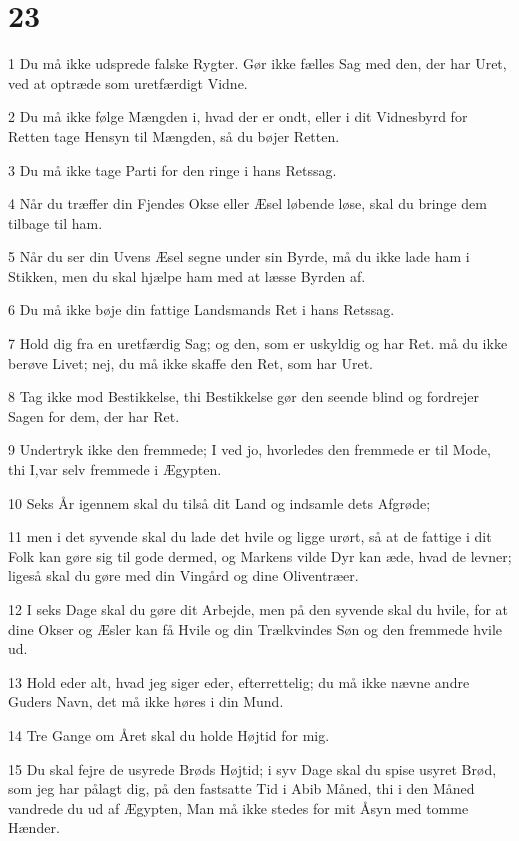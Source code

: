 \chapter{23}

\par 1 Du må ikke udsprede falske Rygter. Gør ikke fælles Sag med den, der har Uret, ved at optræde som uretfærdigt Vidne.
\par 2 Du må ikke følge Mængden i, hvad der er ondt, eller i dit Vidnesbyrd for Retten tage Hensyn til Mængden, så du bøjer Retten.
\par 3 Du må ikke tage Parti for den ringe i hans Retssag.
\par 4 Når du træffer din Fjendes Okse eller Æsel løbende løse, skal du bringe dem tilbage til ham.
\par 5 Når du ser din Uvens Æsel segne under sin Byrde, må du ikke lade ham i Stikken, men du skal hjælpe ham med at læsse Byrden af.
\par 6 Du må ikke bøje din fattige Landsmands Ret i hans Retssag.
\par 7 Hold dig fra en uretfærdig Sag; og den, som er uskyldig og har Ret. må du ikke berøve Livet; nej, du må ikke skaffe den Ret, som har Uret.
\par 8 Tag ikke mod Bestikkelse, thi Bestikkelse gør den seende blind og fordrejer Sagen for dem, der har Ret.
\par 9 Undertryk ikke den fremmede; I ved jo, hvorledes den fremmede er til Mode, thi I,var selv fremmede i Ægypten.
\par 10 Seks År igennem skal du tilså dit Land og indsamle dets Afgrøde;
\par 11 men i det syvende skal du lade det hvile og ligge urørt, så at de fattige i dit Folk kan gøre sig til gode dermed, og Markens vilde Dyr kan æde, hvad de levner; ligeså skal du gøre med din Vingård og dine Oliventræer.
\par 12 I seks Dage skal du gøre dit Arbejde, men på den syvende skal du hvile, for at dine Okser og Æsler kan få Hvile og din Trælkvindes Søn og den fremmede hvile ud.
\par 13 Hold eder alt, hvad jeg siger eder, efterrettelig; du må ikke nævne andre Guders Navn, det må ikke høres i din Mund.
\par 14 Tre Gange om Året skal du holde Højtid for mig.
\par 15 Du skal fejre de usyrede Brøds Højtid; i syv Dage skal du spise usyret Brød, som jeg har pålagt dig, på den fastsatte Tid i Abib Måned, thi i den Måned vandrede du ud af Ægypten, Man må ikke stedes for mit Åsyn med tomme Hænder.
